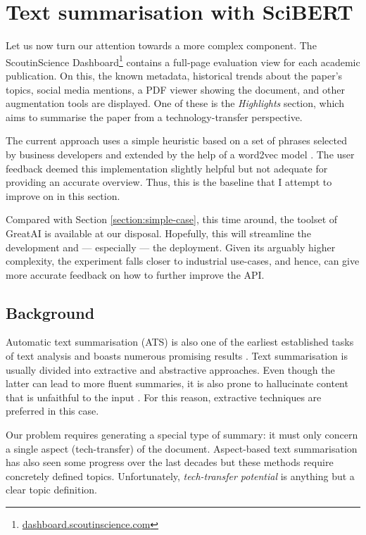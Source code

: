 \section{Text summarisation with SciBERT}

Let us now turn our attention towards a more complex component. The ScoutinScience Dashboard\footnote{\href{https://dashboard.scoutinscience.com/}{dashboard.scoutinscience.com}} contains a full-page evaluation view for each academic publication. On this, the known metadata, historical trends about the paper's topics, social media mentions, a PDF viewer showing the document, and other augmentation tools are displayed. One of these is the \textit{Highlights} section, which aims to summarise the paper from a technology-transfer perspective.

The current approach uses a simple heuristic based on a set of phrases selected by business developers and extended by the help of a word2vec model \cite{mikolov2013efficient}. The user feedback deemed this implementation slightly helpful but not adequate for providing an accurate overview. Thus, this is the baseline that I attempt to improve on in this section.

\begin{displayquote}
Compared with Section \ref{section:simple-case}, this time around, the toolset of GreatAI is available at our disposal. Hopefully, this will streamline the development and --- especially --- the deployment. Given its arguably higher complexity, the experiment falls closer to industrial use-cases, and hence, can give more accurate feedback on how to further improve the API.
\end{displayquote}

\subsection{Background}

Automatic text summarisation (ATS) is also one of the earliest established tasks of text analysis and boasts numerous promising results \cite{el2021automatic}. Text summarisation is usually divided into extractive and abstractive approaches. Even though the latter can lead to more fluent summaries, it is also prone to hallucinate content that is unfaithful to the input \cite{maynez2020faithfulness}. For this reason, extractive techniques are preferred in this case.

Our problem requires generating a special type of summary: it must only concern a single aspect (tech-transfer) of the document. Aspect-based text summarisation has also seen some progress over the last decades \cite{berkovsky2008aspect,hayashi2021wikiasp} but these methods require concretely defined topics. Unfortunately, \textit{tech-transfer potential} is anything but a clear topic definition.

